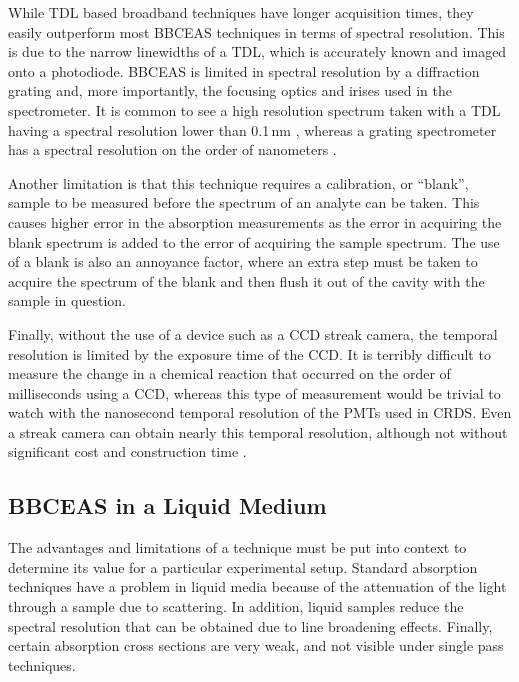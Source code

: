 
While \ac{TDL} based broadband techniques have longer acquisition times,
they easily outperform most \ac{BBCEAS} techniques in terms of spectral
resolution. This is due to the narrow linewidths of a \ac{TDL}, which is
accurately known and imaged onto a photodiode. \ac{BBCEAS} is limited in
spectral resolution by a diffraction grating and, more importantly, the
focusing optics and irises used in the spectrometer. It is common to see a
high resolution spectrum taken with a \ac{TDL} having a spectral resolution
lower than 0.1\,nm \cite{Wieman:2000vd}, whereas a grating spectrometer has a
spectral resolution on the order of nanometers \cite{Kiwanuka:2010bj}.

Another limitation is that this technique requires a calibration, or ``blank'',
sample to be measured before the spectrum of an analyte can be taken. This
causes higher error in the absorption measurements as the error in acquiring
the blank spectrum is added to the error of acquiring the sample spectrum. The
use of a blank is also an annoyance factor, where an extra step must be taken
to acquire the spectrum of the blank and then flush it out of the cavity with
the sample in question.

Finally, without the use of a device such as a \ac{CCD} streak camera, the
temporal resolution is limited by the exposure time of the \ac{CCD}. It is
terribly difficult to measure the change in a chemical reaction that occurred
on the order of milliseconds using a \ac{CCD}, whereas this type of measurement
would be trivial to watch with the nanosecond temporal resolution of the
\acp{PMT} used in \ac{CRDS}. Even a streak camera can obtain nearly this
temporal resolution, although not without significant cost and construction
time \cite{Velten:2011vq}.



\subsection{BBCEAS in a Liquid Medium}\label{subsec:bbceas_liq}

The advantages and limitations of a technique must be put into context to
determine its value for a particular experimental setup. Standard absorption
techniques have a problem in liquid media because of the attenuation of the
light through a sample due to scattering. In addition, liquid samples reduce
the spectral resolution that can be obtained due to line broadening effects.
Finally, certain absorption cross sections are very weak, and not visible
under single pass techniques.

